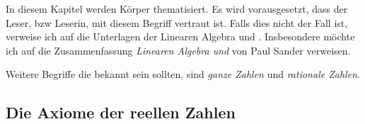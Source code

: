 In diesem Kapitel werden Körper thematisiert. Es wird vorausgesetzt,
dass der Leser, bzw Leserin, mit diesem Begriff vertraut ist.
Falls dies nicht der Fall ist, verweise ich auf die 
Unterlagen der Linearen Algebra  und . 
Insbesondere möchte ich auf die Zusammenfassung 
\textit{Linearen Algebra  und }
von Paul Sander verweisen.

Weitere Begriffe die bekannt sein sollten, sind \textit{ganze Zahlen}
und \textit{rationale Zahlen}.


\subsection{Die Axiome der reellen Zahlen}

\vspace{1\baselineskip}


\vspace{1\baselineskip}

